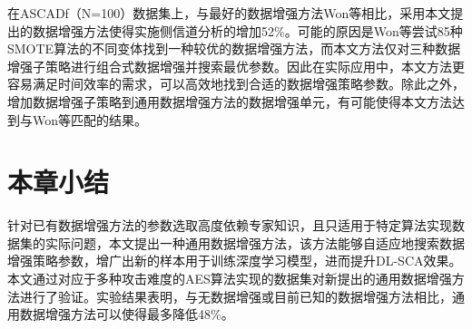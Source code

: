 {	在ASCADf（N=100）数据集上，与最好的数据增强方法Won等\citep{Won20}相比，采用本文提出的数据增强方法使得实施侧信道分析的\chenggongtiaoshu 增加52\%。可能的原因是Won等\citep{Won20}尝试85种SMOTE算法的不同变体找到一种较优的数据增强方法，而本文方法仅对三种数据增强子策略进行组合式数据增强并搜索最优参数。因此在实际应用中，本文方法更容易满足时间效率的需求，可以高效地找到合适的数据增强策略参数。除此之外，增加数据增强子策略到通用数据增强方法的数据增强单元，有可能使得本文方法达到与Won等\citep{Won20}匹配的结果。
	\section{本章小结}
	针对已有数据增强方法的参数选取高度依赖专家知识，且只适用于特定算法实现数据集的实际问题，本文提出一种通用数据增强方法，该方法能够自适应地搜索数据增强策略参数，增广出新的样本用于训练深度学习模型，进而提升DL-SCA效果。本文通过对应于多种攻击难度的AES算法实现的数据集对新提出的通用数据增强方法进行了验证。实验结果表明，与无数据增强或目前已知的数据增强方法相比，通用数据增强方法可以使得\chenggongtiaoshu 最多降低48\%。
}